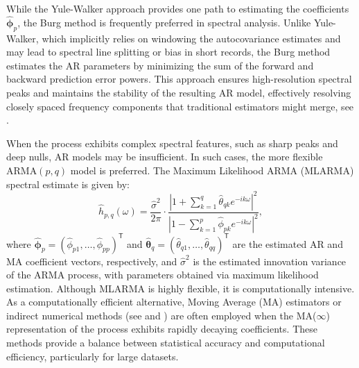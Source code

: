 \documentclass[twoside]{article}
\begin{document}
While the Yule-Walker approach provides one path to estimating the coefficients $\widehat{\boldsymbol{\phi}}_p$, the Burg method is frequently preferred in spectral analysis. Unlike Yule-Walker, which implicitly relies on windowing the autocovariance estimates and may lead to spectral line splitting or bias in short records, the Burg method estimates the AR parameters by minimizing the sum of the forward and backward prediction error powers. This approach ensures high-resolution spectral peaks and maintains the stability of the resulting AR model, effectively resolving closely spaced frequency components that traditional estimators might merge, see \cite{BrockwellDavis:1991}.



When the process exhibits complex spectral features, such as sharp peaks and deep nulls, AR models may be insufficient. In such cases, the more flexible ARMA$(p,q)$ model is preferred. The Maximum Likelihood ARMA (MLARMA) spectral estimate is given by:
\begin{equation}
\widehat{h}_{p,q}(\omega) = \frac{\widehat{\sigma}^2}{2\pi} \cdot \frac{\left| 1 + \sum_{k=1}^{q}\widehat{\theta}_{qk} e^{-ik\omega} \right|^2}{\left| 1 - \sum_{k=1}^{p} \widehat{\phi}_{pk} e^{-ik\omega} \right|^2},
\end{equation}
where $\widehat{\boldsymbol{\phi}}_p = (\widehat{\phi}_{p1}, \dots, \widehat{\phi}_{pp})^{\mathsf{T}}$ and $\widehat{\boldsymbol{\theta}}_q = (\widehat{\theta}_{q1}, \dots, \widehat{\theta}_{qq})^{\mathsf{T}}$ are the estimated AR and MA coefficient vectors, respectively, and $\widehat{\sigma}^2$ is the estimated innovation variance of the ARMA process, with parameters obtained via maximum likelihood estimation. Although MLARMA is highly flexible, it is computationally intensive. As a computationally efficient alternative, Moving Average (MA) estimators or indirect numerical methods (see \cite{Stoicaetal:2000} and \cite{Dumitrescuetal:2001}) are often employed when the MA($\infty$) representation of the process exhibits rapidly decaying coefficients. These methods provide a balance between statistical accuracy and computational efficiency, particularly for large datasets.
\end{document}
